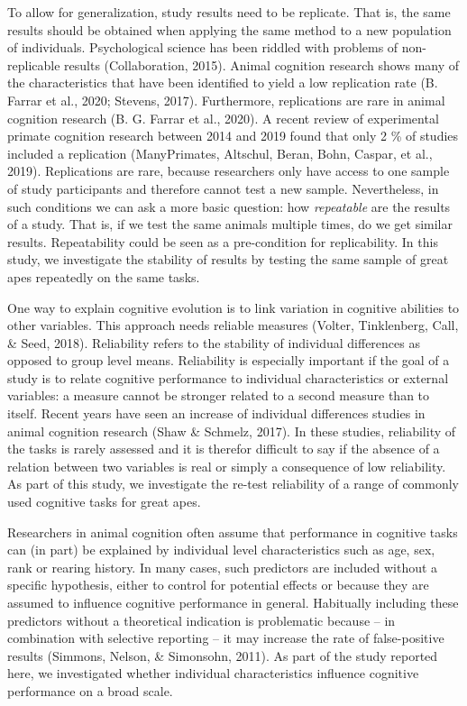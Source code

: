 \documentclass[10pt, letterpaper]{article}
\begin{document}
To allow for generalization, study results need to be replicate. That
is, the same results should be obtained when applying the same method to
a new population of individuals. Psychological science has been riddled
with problems of non-replicable results (Collaboration, 2015). Animal
cognition research shows many of the characteristics that have been
identified to yield a low replication rate (B. Farrar et al., 2020;
Stevens, 2017). Furthermore, replications are rare in animal cognition
research (B. G. Farrar et al., 2020). A recent review of experimental
primate cognition research between 2014 and 2019 found that only 2 \% of
studies included a replication (ManyPrimates, Altschul, Beran, Bohn,
Caspar, et al., 2019). Replications are rare, because researchers only
have access to one sample of study participants and therefore cannot
test a new sample. Nevertheless, in such conditions we can ask a more
basic question: how \emph{repeatable} are the results of a study. That
is, if we test the same animals multiple times, do we get similar
results. Repeatability could be seen as a pre-condition for
replicability. In this study, we investigate the stability of results by
testing the same sample of great apes repeatedly on the same tasks.

One way to explain cognitive evolution is to link variation in cognitive
abilities to other variables. This approach needs reliable measures
(Volter, Tinklenberg, Call, \& Seed, 2018). Reliability refers to the
stability of individual differences as opposed to group level means.
Reliability is especially important if the goal of a study is to relate
cognitive performance to individual characteristics or external
variables: a measure cannot be stronger related to a second measure than
to itself. Recent years have seen an increase of individual differences
studies in animal cognition research (Shaw \& Schmelz, 2017). In these
studies, reliability of the tasks is rarely assessed and it is therefor
difficult to say if the absence of a relation between two variables is
real or simply a consequence of low reliability. As part of this study,
we investigate the re-test reliability of a range of commonly used
cognitive tasks for great apes.

Researchers in animal cognition often assume that performance in
cognitive tasks can (in part) be explained by individual level
characteristics such as age, sex, rank or rearing history. In many
cases, such predictors are included without a specific hypothesis,
either to control for potential effects or because they are assumed to
influence cognitive performance in general. Habitually including these
predictors without a theoretical indication is problematic because -- in
combination with selective reporting -- it may increase the rate of
false-positive results (Simmons, Nelson, \& Simonsohn, 2011). As part of
the study reported here, we investigated whether individual
characteristics influence cognitive performance on a broad scale.
\end{document}

